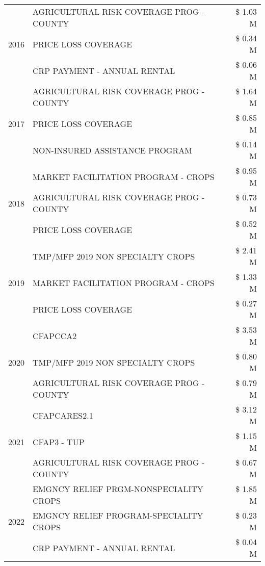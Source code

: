 \begin{tabular}{llr}
\cline{1-3}
\multirow[t]{3}{*}{2016} & AGRICULTURAL RISK COVERAGE PROG - COUNTY & \$ 1.03 M \\
 & PRICE LOSS COVERAGE & \$ 0.34 M \\
 & CRP PAYMENT - ANNUAL RENTAL & \$ 0.06 M \\
\cline{1-3}
\multirow[t]{3}{*}{2017} & AGRICULTURAL RISK COVERAGE PROG - COUNTY & \$ 1.64 M \\
 & PRICE LOSS COVERAGE & \$ 0.85 M \\
 & NON-INSURED ASSISTANCE PROGRAM & \$ 0.14 M \\
\cline{1-3}
\multirow[t]{3}{*}{2018} & MARKET FACILITATION PROGRAM - CROPS & \$ 0.95 M \\
 & AGRICULTURAL RISK COVERAGE PROG - COUNTY & \$ 0.73 M \\
 & PRICE LOSS COVERAGE & \$ 0.52 M \\
\cline{1-3}
\multirow[t]{3}{*}{2019} & TMP/MFP 2019 NON SPECIALTY CROPS & \$ 2.41 M \\
 & MARKET FACILITATION PROGRAM - CROPS & \$ 1.33 M \\
 & PRICE LOSS COVERAGE & \$ 0.27 M \\
\cline{1-3}
\multirow[t]{3}{*}{2020} & CFAPCCA2 & \$ 3.53 M \\
 & TMP/MFP 2019 NON SPECIALTY CROPS & \$ 0.80 M \\
 & AGRICULTURAL RISK COVERAGE PROG - COUNTY & \$ 0.79 M \\
\cline{1-3}
\multirow[t]{3}{*}{2021} & CFAPCARES2.1 & \$ 3.12 M \\
 & CFAP3 - TUP & \$ 1.15 M \\
 & AGRICULTURAL RISK COVERAGE PROG - COUNTY & \$ 0.67 M \\
\cline{1-3}
\multirow[t]{3}{*}{2022} & EMGNCY RELIEF PRGM-NONSPECIALITY CROPS & \$ 1.85 M \\
 & EMGNCY RELIEF PROGRAM-SPECIALITY CROPS & \$ 0.23 M \\
 & CRP PAYMENT - ANNUAL RENTAL & \$ 0.04 M \\
\cline{1-3}
\bottomrule
\end{tabular}
